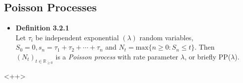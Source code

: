 \documentclass[11pt,a4paper]{article}
\begin{document}
\subsection{Poisson Processes}
\begin{itemize}
	\item \textbf{Definition 3.2.1} \\
		Let $\tau_i$ be independent exponential $(\lambda)$ random variables,
		$S_0 = 0, s_n = \tau_1 + \tau_2 + \cdots + \tau_n$ and
		$N_t = \text{max}\{n \geq 0 : S_n \leq t \}$.
		Then $(N_t)_{t \in \mathbb{R}_{\geq 0}}$ is a \emph{Poisson process} with rate parameter $\lambda$, or briefly PP($\lambda$).
\end{itemize}
<++>
\end{document}
